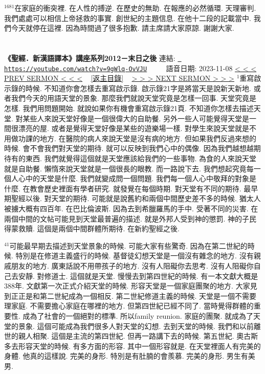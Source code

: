 \documentclass{book}
\begin{document}
$^{1681}$在家庭的衝突裡.
在人性的搏逆.
在歷史的無助.
在報應的必然循環.
天理審判.
我們處處可以相信上帝拯救的事實.
創世紀的主題信息.
在他十二段的記載當中.
我們今天就停在這裡.
因為時間過了很多抱歉.
請主席請大家原諒.
謝謝大家.
\newpage



\section{}
\label{sec:9gWlq_OvVJU}
\textbf{《聖經．新漢語譯本》講座系列2012－末日之後}
\newline
\newline
連結: \href{https://youtube.com/watch?v=9gWlq-OvVJU}{\texttt{ https://youtube.com/watch?v=9gWlq-OvVJU}} ~~~~ 語音日期: 2023-11-08 
\newline
\newline
\hyperref[sec:ok3V257cOIA]{\small{< < < PREV SERMON < < <}}
~
\hyperref[sec:index]{\small{[返主目錄]}}
~
\hyperref[sec:L7Klx5S64nM]{\small{> > > NEXT SERMON > > >}}
\newline
\newline
$^{1}$重寫啟示錄的時候.
不知道你會怎樣去重寫啟示錄.
啟示錄21字是將當天是說新天新地.
或者我們今天的用語天堂的景象.
那麼我們就說天堂究竟是怎樣一回事.
天堂究竟是怎樣.
我們用問題開始.
就說如果你有機會重寫啟示錄21頁.
不知道你怎樣去描述天堂.
對某些人來說天堂好像是一個很偉大的自助餐.
另外一些人可能覺得天堂是一間很漂亮的屋.
或者是覺得天堂好像是某些的遊樂場一樣.
對學生來說天堂就是不用做功課的地方.
在醫院的病人來說天堂是沒有病的地方.
但如果我們反過來想的時候.
會不會我們對天堂的期待.
就可以反映到我們心中的偶像.
因為我們越想越期待有的東西.
我們就覺得這個就是天堂應該給我們的一些事物.
為食的人來說天堂就是自助餐.
懶惰來說天堂就是一個很長的眼教.
而一路說下去.
我們想起究竟每一個人心中的天堂是什麼.
我們就變成問一個問題.
我們每一個人心中敬拜的對象是什麼.
在教會歷史裡面有學者研究.
就發覺在每個時期.
對天堂有不同的期待.
最早期聖經以後.
對天堂的期待.
可能就是說舊約和兩個中間歷史差不多的時候.
猶太人被擄大概有四百年.
在巴比倫波斯.
因為去到希臘羅馬的手中.
受著不同的災害.
在兩個中間的文帖可能見到天堂最普遍的描述.
就是外邦人受到神的懲罰.
神的子民得蒙救贖.
這個是兩個中間群體所期待.
在新約聖經之後.

$^{41}$可能最早期去描述到天堂景象的時候.
可能大家有些驚奇.
因為在第二世紀的時候.
特別是在修道主義盛行的時候.
基督徒幻想天堂是一個沒有雜念的地方.
沒有親戚朋友的地方.
廣東話說不用帶孩子的地方.
沒有人阻礙你去思考.
沒有人阻礙你自己去安靜.
對修道士.
這個就是天堂.
慢慢去到第四世紀的時候.
有一本文獻大概是388年.
文獻第一次正式介紹天堂的時候.
形容天堂是一個家庭團聚的地方.
大家見到正正是和第二世紀成為一個相反.
第二世紀修道主義的時候.
天堂是一個不需要理家庭.
不需要擔心家庭在哪裡的地方.
但第四世紀已經不同了.
當時覺得群體的重要性.
成為了社會的一個絕對的標準.
所以family reunion.
家庭的團聚.
就成為了天堂的景象.
這個可能成為我們很多人對天堂的幻想.
去到天堂的時候.
我們和以前離世的親人相聚.
這個是主流的第四世紀.
但再一路講下去的時候.
第五世紀.
奧古斯多去形容天堂的時候.
有多方面的形容.
其中一個形容就是.
在天堂裡面人有完美的身體.
他真的這樣說.
完美的身形.
特別是有肚腩的會羨慕.
完美的身形.
男生有美男.
\end{document}
